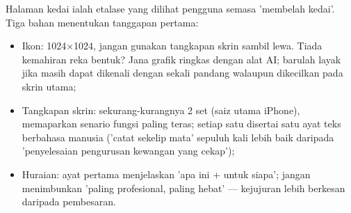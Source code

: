 
Halaman kedai ialah etalase yang dilihat pengguna semasa 'membelah kedai'. Tiga bahan menentukan tanggapan pertama:

\begin{itemize}
  \item Ikon: 1024×1024, jangan gunakan tangkapan skrin sambil lewa. Tiada kemahiran reka bentuk? Jana grafik ringkas dengan alat AI; barulah layak jika masih dapat dikenali dengan sekali pandang walaupun dikecilkan pada skrin utama;
  \item Tangkapan skrin: sekurang-kurangnya 2 set (saiz utama iPhone), memaparkan senario fungsi paling teras; setiap satu disertai satu ayat teks berbahasa manusia ('catat sekelip mata' sepuluh kali lebih baik daripada 'penyelesaian pengurusan kewangan yang cekap');
  \item Huraian: ayat pertama menjelaskan 'apa ini + untuk siapa'; jangan menimbunkan 'paling profesional, paling hebat' — kejujuran lebih berkesan daripada pembesaran.
\end{itemize}

